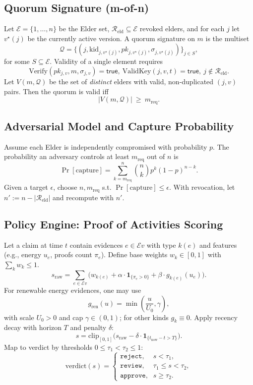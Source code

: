 \documentclass[11pt,a4paper]{article}
\begin{document}
\subsection{Quorum Signature (m-of-n)}
Let $\mathcal{E}=\{1,\dots,n\}$ be the Elder set, $\mathcal{R}_{\text{eld}}\subseteq\mathcal{E}$ revoked elders, and for each $j$ let $v^\star(j)$ be the currently active version. A quorum signature on $m$ is the multiset
\[
\mathcal{Q}=\big\{(j, \mathrm{kid}_{j,v^\star(j)}, pk_{j,v^\star(j)}, \sigma_{j,v^\star(j)})\big\}_{j\in S},
\]
for some $S\subseteq \mathcal{E}$.
Validity of a single element requires
\[
\mathrm{Verify}(pk_{j,v}, m, \sigma_{j,v})=\textsf{true},\ \mathrm{ValidKey}(j,v,t)=\textsf{true},\ j\notin \mathcal{R}_{\text{eld}}.
\]
Let $V(m,\mathcal{Q})$ be the set of \emph{distinct} elders with valid, non-duplicated $(j,v)$ pairs. Then the quorum is valid iff
\[
|V(m,\mathcal{Q})|\ \ge\ m_{\mathrm{req}}.
\]

\subsection{Adversarial Model and Capture Probability}
Assume each Elder is independently compromised with probability $p$. The probability an adversary controls at least $m_{\mathrm{req}}$ out of $n$ is
\[
\Pr[\text{capture}] = \sum_{k=m_{\mathrm{req}}}^{n} \binom{n}{k} p^{k}(1-p)^{n-k}.
\]
Given a target $\epsilon$, choose $n,m_{\mathrm{req}}$ s.t. $\Pr[\text{capture}]\le \epsilon$. With revocation, let $n' := n-|\mathcal{R}_{\text{eld}}|$ and recompute with $n'$.

\subsection{Policy Engine: Proof of Activities Scoring}
Let a claim at time $t$ contain evidences $e\in \mathcal{E}\!v$ with type $k(e)$ and features (e.g., energy $u_e$, proofs count $\pi_e$). Define base weights $w_k\in [0,1]$ with $\sum_k w_k \le 1$.
\[
s_{\text{raw}} = \sum_{e\in \mathcal{E}\!v}\Big(w_{k(e)} + \alpha \cdot \mathbf{1}_{\{\pi_e>0\}} + \beta \cdot g_{k(e)}(u_e)\Big).
\]
For renewable energy evidences, one may use
\[
g_{\text{ren}}(u) = \min\left(\frac{u}{U_0}, \gamma\right),
\]
with scale $U_0>0$ and cap $\gamma\in(0,1)$; for other kinds $g_k\equiv 0$. Apply recency decay with horizon $T$ and penalty $\delta$:
\[
s = \mathrm{clip}_{[0,1]}\Big(s_{\text{raw}} - \delta\cdot \mathbf{1}_{\{t_{\text{now}}-t > T\}}\Big).
\]
Map to verdict by thresholds $0\le \tau_1<\tau_2\le 1$:
\[
\mathrm{verdict}(s)=
\begin{cases}
\texttt{reject}, & s<\tau_1,\\
\texttt{review}, & \tau_1\le s<\tau_2,\\
\texttt{approve}, & s\ge \tau_2.
\end{cases}
\]
\end{document}
